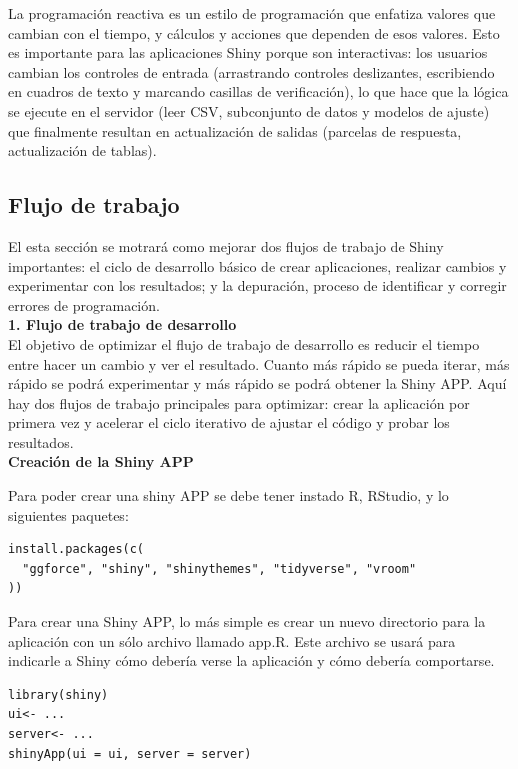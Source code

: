 La programación reactiva es un estilo de programación que enfatiza valores que cambian con el tiempo, y cálculos y acciones que dependen de esos valores. Esto es importante para las aplicaciones Shiny porque son interactivas: los usuarios cambian los controles de entrada (arrastrando controles deslizantes, escribiendo en cuadros de texto y marcando casillas de verificación), lo que hace que la lógica se ejecute en el servidor (leer CSV, subconjunto de datos y modelos de ajuste) que finalmente resultan en actualización de salidas (parcelas de respuesta, actualización de tablas).

\subsection{Flujo de trabajo}

El esta sección se motrará como mejorar dos flujos de trabajo de Shiny importantes: el ciclo de desarrollo básico de crear aplicaciones, realizar cambios y experimentar con los resultados; y la depuración, proceso de identificar y corregir errores de programación.\\


\textbf{1.\hspace{1cm} Flujo de trabajo de desarrollo}\\


El objetivo de optimizar el flujo de trabajo de desarrollo es reducir el tiempo entre hacer un cambio y ver el resultado. Cuanto más rápido se pueda iterar, más rápido se podrá experimentar y más rápido se podrá obtener la Shiny APP. Aquí hay dos flujos de trabajo principales para optimizar: crear la aplicación por primera vez y acelerar el ciclo iterativo de ajustar el código y probar los resultados.\\


\textbf{Creación de la Shiny APP}


Para poder crear una shiny APP se debe tener instado R, RStudio, y lo siguientes paquetes:

\begin{lstlisting}
install.packages(c(
  "ggforce", "shiny", "shinythemes", "tidyverse", "vroom" 
))
\end{lstlisting}

Para crear una Shiny APP, lo más simple es crear un nuevo directorio para la aplicación con un sólo archivo llamado app.R. Este archivo se usará para indicarle a Shiny cómo debería verse la aplicación y cómo debería comportarse.

\begin{lstlisting}[frame=single]
library(shiny)
ui<- ...
server<- ...
shinyApp(ui = ui, server = server)
\end{lstlisting}


